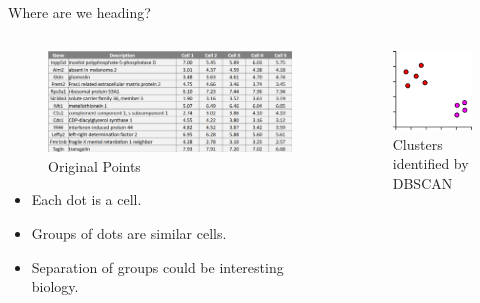 \begin{frame}[allowframebreaks]{Where are we heading?}
\begin{columns}
    \begin{column}{0.7\textwidth}
       \begin{figure}
            \centering
            \includegraphics[width=1.05\textwidth,keepaspectratio]{images/dul/gene-datapoints.png}
            \caption{Original Points}
        \end{figure}
        \vspace{1em}
        \begin{itemize}
            \item Each dot is a cell.
            \item Groups of dots are similar cells.
            \item Separation of groups could be interesting biology.
        \end{itemize}
    \end{column}
    \begin{column}{0.3\textwidth}
        \begin{figure}
            \centering
            \includegraphics[width=1\textwidth,keepaspectratio]{images/dul/gene-datapoints-plot.png}
            \caption{Clusters identified by DBSCAN}
        \end{figure}
    \end{column}
\end{columns}
\end{frame}


